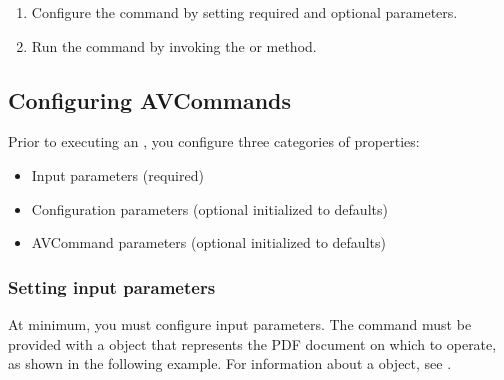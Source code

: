 \documentclass[letterpaper,12pt,english,openany,oneside]{sphinxmanual}
\begin{document}
\begin{sphinxVerbatim}[commandchars=\\\{\}]
 
  
    
   
\end{sphinxVerbatim}
\begin{enumerate}
%
\setcounter{enumi}{1}
\item {} 
Configure the command by setting required and optional parameters.

\item {} 
Run the command by invoking the  or  method.

\end{enumerate}


\subsection{Configuring AVCommands}
\label{\detokenize{Plugins_Handlers:configuring-avcommands}}
Prior to executing an , you configure three categories of properties:
\begin{itemize}
\item {} 
Input parameters (required)

\item {} 
Configuration parameters (optional \sphinxhyphen{} initialized to defaults)

\item {} 
AVCommand parameters (optional \sphinxhyphen{} initialized to defaults)

\end{itemize}


\subsubsection{Setting input parameters}
\label{\detokenize{Plugins_Handlers:setting-input-parameters}}
At minimum, you must configure input parameters. The command must be provided with a  object that represents the PDF document on which to operate, as shown in the following example. For information about a  object, see .
\end{document}
